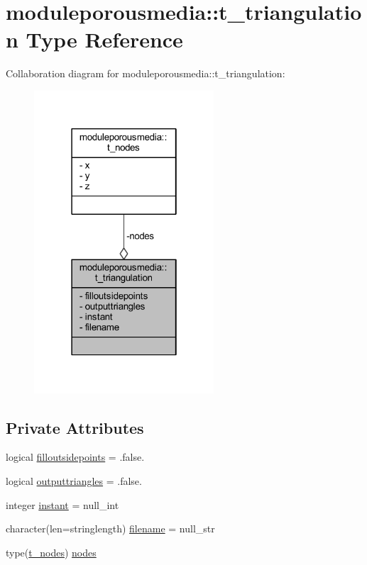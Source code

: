 \hypertarget{structmoduleporousmedia_1_1t__triangulation}{}\section{moduleporousmedia\+:\+:t\+\_\+triangulation Type Reference}
\label{structmoduleporousmedia_1_1t__triangulation}


Collaboration diagram for moduleporousmedia\+:\+:t\+\_\+triangulation\+:\nopagebreak
\begin{figure}[H]
\begin{center}
\leavevmode
\includegraphics[width=190pt]{structmoduleporousmedia_1_1t__triangulation__coll__graph}
\end{center}
\end{figure}
\subsection*{Private Attributes}
\begin{DoxyCompactItemize}
\item 
logical \mbox{\hyperlink{structmoduleporousmedia_1_1t__triangulation_a8b2724661323bd3e6f256e237d5a207c}{filloutsidepoints}} = .false.
\item 
logical \mbox{\hyperlink{structmoduleporousmedia_1_1t__triangulation_ae85109c14e4995fdad396bc6e65ce40e}{outputtriangles}} = .false.
\item 
integer \mbox{\hyperlink{structmoduleporousmedia_1_1t__triangulation_a54503539166bc0bfaa580d426ee5602b}{instant}} = null\+\_\+int
\item 
character(len=stringlength) \mbox{\hyperlink{structmoduleporousmedia_1_1t__triangulation_a3f03d156f211345a2a1a178227fd4227}{filename}} = null\+\_\+str
\item 
type(\mbox{\hyperlink{structmoduleporousmedia_1_1t__nodes}{t\+\_\+nodes}}) \mbox{\hyperlink{structmoduleporousmedia_1_1t__triangulation_a2b64c0933b5a13f1f0cd9cc391954ec9}{nodes}}
\end{DoxyCompactItemize}


